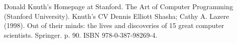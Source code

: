 \documentclass[a4paper,11pt]{article}
\begin{document}
\begin{thebibliography}{99} %
  Donald Knuth's Homepage at Stanford.
 The Art of Computer Programming (Stanford University).
 Knuth's CV
 Dennis Elliott Shasha; Cathy A. Lazere (1998). Out of their minds: the lives and discoveries of 15 great computer scientists. Springer. p. 90. ISBN 978-0-387-98269-4.
\end{thebibliography}
\end{document}
